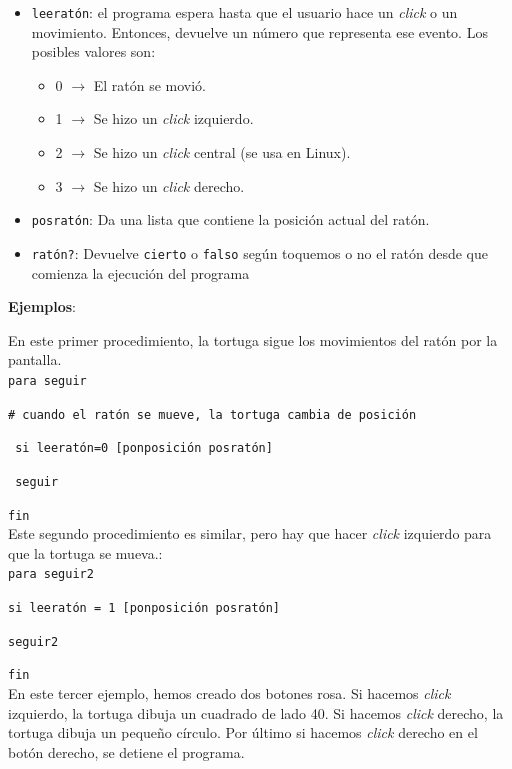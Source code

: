 \begin{itemize}
   \item \texttt{leerat\'on}: el programa espera hasta que el usuario hace
      un \textit{click} o un movimiento. Entonces, devuelve un n\'umero que
      representa ese evento. Los posibles valores son:
      \begin{itemize}
         \item 0 $\rightarrow$ El rat\'on se movi\'o.
         \item 1 $\rightarrow$ Se hizo un \textit{click} izquierdo.
         \item 2 $\rightarrow$ Se hizo un \textit{click} central (se usa en Linux).
         \item 3 $\rightarrow$ Se hizo un \textit{click} derecho.
      \end{itemize}
   \item \texttt{posrat\'on}: Da una lista que contiene la posici\'on actual del
      rat\'on.
   \item \texttt{rat\'on?}: Devuelve \texttt{cierto} o \texttt{falso} seg\'un
      toquemos o no el rat\'on desde que comienza la ejecuci\'on del programa
\end{itemize}


\noindent \textbf{Ejemplos}:

En este primer procedimiento, la tortuga sigue los movimientos del rat\'on por
la pantalla. \\

\noindent \texttt{para seguir}

\noindent \texttt{\# cuando el rat\'on se mueve, la tortuga cambia de posici\'on}

 \texttt{ si leerat\'on=0 [ponposici\'on posrat\'on]}

 \texttt{ seguir}

\noindent \texttt{fin} \\

\noindent Este segundo procedimiento es similar, pero hay que hacer \textit{click}
izquierdo para que la tortuga se mueva.: \\

\noindent \texttt{para seguir2}

\texttt{si leerat\'on = 1 [ponposici\'on posrat\'on]}

\texttt{seguir2}

\noindent \texttt{fin} \\

\noindent En este tercer ejemplo, hemos creado dos botones rosa. Si hacemos
   \textit{click} izquierdo, la tortuga dibuja un cuadrado de lado 40. Si
   hacemos \textit{click} derecho, la tortuga dibuja un peque\~no c\'irculo.
   Por \'ultimo si hacemos \textit{click} derecho en el bot\'on derecho, se
   detiene el programa.

